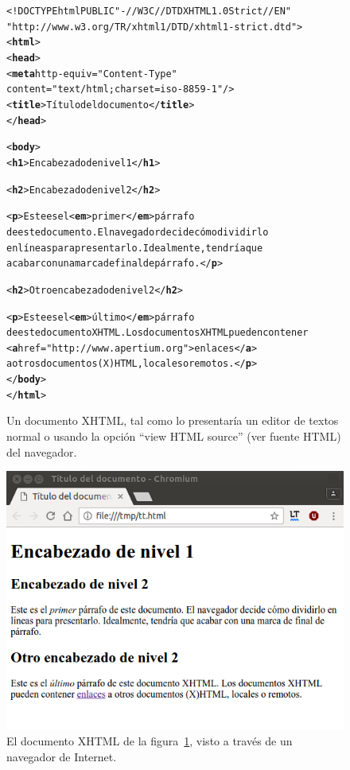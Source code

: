 \begin{figure} \begin{center} 
\begin{alltt} 
<!DOCTYPE html PUBLIC "-//W3C//DTD XHTML 1.0 Strict//EN" 
      "http://www.w3.org/TR/xhtml1/DTD/xhtml1-strict.dtd"> 
<\textbf{html}> 
  <\textbf{head}> 
    <\textbf{meta} http-equiv="Content-Type" 
          content="text/html; charset=iso-8859-1"/> 
    <\textbf{title}>Título del documento</\textbf{title}> 
  </\textbf{head}> 

  <\textbf{body}> 
    <\textbf{h1}>Encabezado de nivel 1</\textbf{h1}> 

    <\textbf{h2}>Encabezado de nivel 2</\textbf{h2}> 

    <\textbf{p}>Este es el <\textbf{em}>primer</\textbf{em}> párrafo 
    de este documento. El navegador decide cómo dividirlo 
    en líneas para presentarlo. Idealmente, tendría que 
    acabar con una marca de final de párrafo. </\textbf{p}> 

    <\textbf{h2}>Otro encabezado de nivel 2</\textbf{h2}> 

    <\textbf{p}>Este es el <\textbf{em}>último</\textbf{em}> párrafo 
    de este documento XHTML. Los documentos XHTML pueden contener 
    <\textbf{a} href="http://www.apertium.org">enlaces</\textbf{a}> 
    a otros documentos (X)HTML, locales o remotos. </\textbf{p}> 
  </\textbf{body}> 
</\textbf{html}> 
\end{alltt} \end{center} \caption{Un documento XHTML, tal como lo presentaría un editor de textos normal o usando la opción ``view HTML source'' (ver fuente HTML) del navegador.} \label{fg:HTML} \end{figure} 

\begin{figure} \begin{center} \includegraphics[scale=0.5]{vista-chromium.jpg} \end{center} \caption{El documento XHTML de la figura~\protect\ref{fg:HTML}, visto a través de un navegador de Internet.} \label{fg:HTMLnav} \end{figure} 

